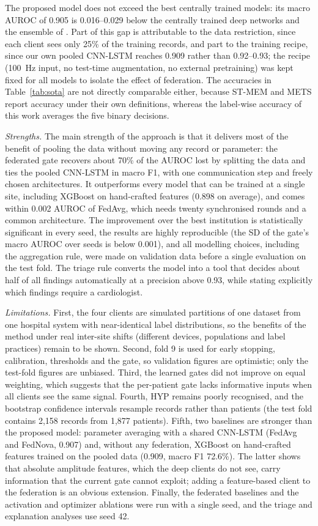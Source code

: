 The proposed model does not exceed the best centrally trained models: its macro AUROC of 0.905 is
0.016--0.029 below the centrally trained deep networks and the ensemble of
\cite{strodthoff2021}. Part of
this gap is attributable to the data restriction, since each client sees only 25\% of the training
records, and part to the training recipe, since our own pooled CNN-LSTM reaches 0.909 rather than
0.92--0.93; the recipe (100~Hz input, no test-time augmentation, no external pretraining) was kept
fixed for all models to isolate the effect of federation. The accuracies in Table~\ref{tab:sota} are
not directly comparable either, because ST-MEM and METS report accuracy under their own definitions, whereas the
label-wise accuracy of this work averages the five binary decisions.

\textit{Strengths.} The main strength of the approach is that it delivers most of the benefit of
pooling the data without moving any record or parameter: the federated gate recovers about 70\% of the
AUROC lost by splitting the data and ties the pooled CNN-LSTM in macro F1, with one communication step
and freely chosen architectures. It outperforms every model that can be trained at a single site,
including XGBoost on hand-crafted features (0.898 on average), and comes within 0.002 AUROC of FedAvg,
which needs twenty synchronised rounds and a common architecture. The improvement over the best institution is statistically
significant in every seed, the results are highly reproducible (the SD of the gate's macro AUROC over
seeds is below 0.001), and all modelling choices, including the aggregation rule, were made on
validation data before a single evaluation on the test fold. The triage rule converts the model into a
tool that decides about half of all findings automatically at a precision above 0.93, while stating
explicitly which findings require a cardiologist.

\textit{Limitations.} First, the four clients are simulated partitions of one dataset from one
hospital system with near-identical label distributions, so the benefits of the method under real
inter-site shifts (different devices, populations and label practices) remain to be shown. Second,
fold 9 is used for early stopping, calibration, thresholds and the gate, so validation figures are
optimistic; only the test-fold figures are unbiased. Third, the learned gates did not improve on
equal weighting, which suggests that the per-patient gate lacks informative inputs when all clients
see the same signal. Fourth, HYP remains poorly recognised, and the bootstrap confidence intervals
resample records rather than patients (the test fold contains 2,158 records from 1,877 patients).
Fifth, two baselines are stronger than the proposed model: parameter averaging with a shared
CNN-LSTM (FedAvg and FedNova, 0.907) and, without any federation, XGBoost on hand-crafted features
trained on the pooled data (0.909, macro F1 72.6\%). The latter shows that absolute amplitude features,
which the deep clients do not see, carry information that the current gate cannot exploit; adding a
feature-based client to the federation is an obvious extension. Finally, the federated baselines and the
activation and optimizer ablations were run with a single seed, and the triage and explanation analyses
use seed 42.

